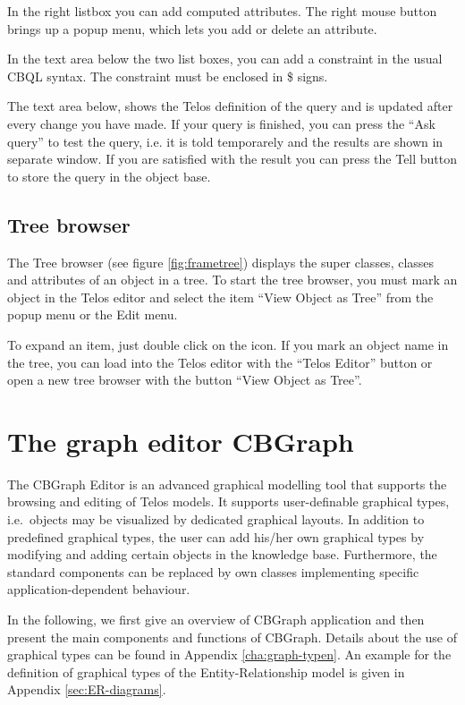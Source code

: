 
In the right listbox you can add computed attributes. The right
mouse button brings up a popup menu, which lets you add or delete
an attribute.

In the text area below the two list boxes, you can add
a constraint in the usual CBQL syntax. The constraint must
be enclosed in \$ signs.

The text area below, shows the Telos definition of the query
and is updated after every change you have made. If your query is
finished, you can press the ``Ask query'' to test the query,
i.e. it is told temporarely and the results are shown in separate
window. If you are satisfied with the result you can press the Tell
button to store the query in the object base.

\subsection{Tree browser}
\label{sec:tree_browser}

The Tree browser (see figure \ref{fig:frametree}) displays the super classes, classes and
attributes of an object in a tree. To start the tree browser,
you must mark an object in the Telos editor and select the
item ``View Object as Tree'' from the popup menu or the Edit
menu.


To expand an item, just double click on the icon. If you mark an object
name in the tree, you can load into the Telos editor with the
``Telos Editor'' button or open a new tree browser with the
button ``View Object as Tree''.


\newpage
\section{The graph editor CBGraph}
\label{sec:graphed}

The CBGraph Editor is an advanced graphical modelling tool that
supports the browsing and editing of Telos models.
It supports user-definable graphical types, i.e.\
objects may be visualized by dedicated graphical layouts. In
addition to predefined graphical types, the user can add his/her own
graphical types by modifying and adding certain objects in the knowledge
base. Furthermore, the standard components can be replaced by own classes
implementing specific application-dependent behaviour.

In the following, we first give an overview of CBGraph application
and then present the main components and functions of CBGraph.
Details about the use of graphical types can be found in Appendix
\ref{cha:graph-typen}. An example for the definition of graphical types
of the Entity-Relationship model is given in Appendix \ref{sec:ER-diagrams}.

